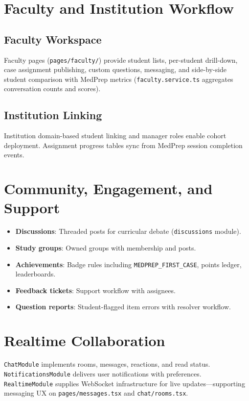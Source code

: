 \section{Faculty and Institution Workflow}
\subsection{Faculty Workspace}
Faculty pages (\texttt{pages/faculty/}) provide student lists, per-student drill-down, case assignment publishing, custom questions, messaging, and side-by-side student comparison with MedPrep metrics (\texttt{faculty.service.ts} aggregates conversation counts and scores).

\subsection{Institution Linking}
Institution domain-based student linking and manager roles enable cohort deployment. Assignment progress tables sync from MedPrep session completion events.

\section{Community, Engagement, and Support}
\begin{itemize}
  \item \textbf{Discussions}: Threaded posts for curricular debate (\texttt{discussions} module).
  \item \textbf{Study groups}: Owned groups with membership and posts.
  \item \textbf{Achievements}: Badge rules including \texttt{MEDPREP\_FIRST\_CASE}, points ledger, leaderboards.
  \item \textbf{Feedback tickets}: Support workflow with assignees.
  \item \textbf{Question reports}: Student-flagged item errors with resolver workflow.
\end{itemize}

\section{Realtime Collaboration}
\texttt{ChatModule} implements rooms, messages, reactions, and read status. \texttt{NotificationsModule} delivers user notifications with preferences. \texttt{RealtimeModule} supplies WebSocket infrastructure for live updates---supporting messaging UX on \texttt{pages/messages.tsx} and \texttt{chat/rooms.tsx}.

